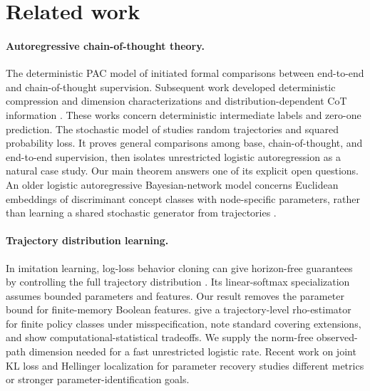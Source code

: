 \documentclass{article}
\theoremstyle{definition}
\theoremstyle{remark}
\begin{document}
\section{Related work}
\label{sec:related}

\paragraph{Autoregressive chain-of-thought theory.} The deterministic PAC model of \citet{joshi2025theory} initiated formal comparisons between end-to-end and chain-of-thought supervision. Subsequent work developed deterministic compression and dimension characterizations \citep{hanneke2026sample,li2026optimal} and distribution-dependent CoT information \citep{altabaa2025cot}. These works concern deterministic intermediate labels and zero-one prediction. The stochastic model of \citet{doronarad2026stochastic} studies random trajectories and squared probability loss. It proves general comparisons among base, chain-of-thought, and end-to-end supervision, then isolates unrestricted logistic autoregression as a natural case study. Our main theorem answers one of its explicit open questions. An older logistic autoregressive Bayesian-network model concerns Euclidean embeddings of discriminant concept classes with node-specific parameters, rather than learning a shared stochastic generator from trajectories \citep{nakamura2005inner}.

\paragraph{Trajectory distribution learning.} In imitation learning, log-loss behavior cloning can give horizon-free guarantees by controlling the full trajectory distribution \citep{foster2024behavior}. Its linear-softmax specialization assumes bounded parameters and features. Our result removes the parameter bound for finite-memory Boolean features. \citet{rohatgi2025computational} give a trajectory-level rho-estimator for finite policy classes under misspecification, note standard covering extensions, and show computational-statistical tradeoffs. We supply the norm-free observed-path dimension needed for a fast unrestricted logistic rate. Recent work on joint KL loss \citep{xu2026autoregressive} and Hellinger localization for parameter recovery \citep{shekhtman2025nearly} studies different metrics or stronger parameter-identification goals.
\end{document}
